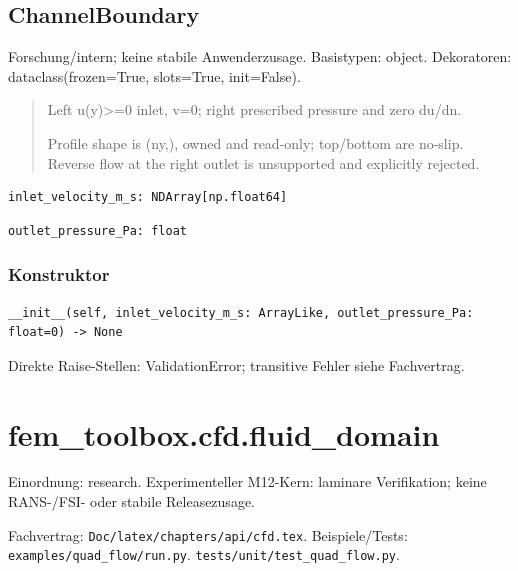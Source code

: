 \subsection{ChannelBoundary}
Forschung/intern; keine stabile Anwenderzusage.
Basistypen: object. Dekoratoren: dataclass(frozen=True, slots=True, init=False).
\begin{quote}
Left u(y)>=0 inlet, v=0; right prescribed pressure and zero du/dn.\par Profile shape is (ny,), owned and read-only; top/bottom are no-slip. Reverse flow at the right outlet is unsupported and explicitly rejected.
\end{quote}
\begin{lstlisting}
inlet_velocity_m_s: NDArray[np.float64]
\end{lstlisting}
\begin{lstlisting}
outlet_pressure_Pa: float
\end{lstlisting}
\subsubsection*{Konstruktor}
\begin{lstlisting}
__init__(self, inlet_velocity_m_s: ArrayLike, outlet_pressure_Pa: float=0) -> None
\end{lstlisting}
Direkte Raise-Stellen: ValidationError; transitive Fehler siehe Fachvertrag.
\section{fem\_toolbox.cfd.fluid\_domain}
Einordnung: research. Experimenteller M12-Kern: laminare Verifikation; keine RANS-/FSI- oder stabile Releasezusage.
\par Fachvertrag: \nolinkurl{Doc/latex/chapters/api/cfd.tex}. Beispiele/Tests:
\nolinkurl{examples/quad_flow/run.py}.
\nolinkurl{tests/unit/test_quad_flow.py}.
